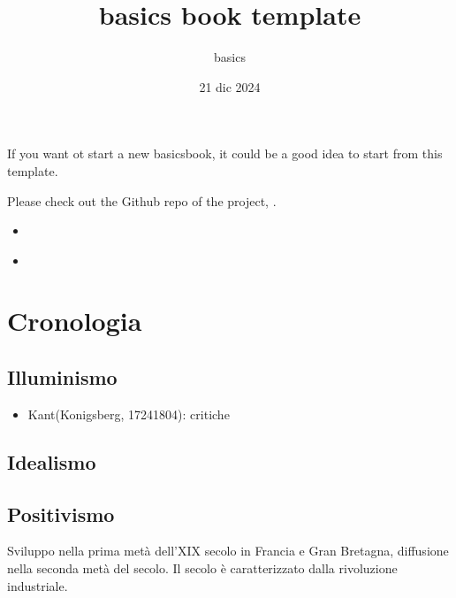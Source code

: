 \documentclass[letterpaper,10pt,italian]{jupyterBook}
\title{basics book template}
\date{21 dic 2024}
\author{basics}
\begin{document}
\pagestyle{empty}
\sphinxmaketitle
\pagestyle{plain}
\sphinxtableofcontents
\pagestyle{normal}
\label{\detokenize{intro::doc}}


\sphinxAtStartPar
If you want ot start a new basics\sphinxhyphen{}book, it could be a good idea to start from this template.

\sphinxAtStartPar
Please check out the Github repo of the project, .
\begin{itemize}
\item {} 
\sphinxAtStartPar
{\hyperref[\detokenize{ch/history::doc}]{}}

\item {} 
\sphinxAtStartPar
{\hyperref[\detokenize{ch/topics::doc}]{}}

\end{itemize}

\sphinxstepscope


\chapter{Cronologia}
\label{\detokenize{ch/history:cronologia}}\label{\detokenize{ch/history:philosophy-chronology}}\label{\detokenize{ch/history::doc}}

\section{Illuminismo}
\label{\detokenize{ch/history:illuminismo}}\label{\detokenize{ch/history:pc-illuminism}}
\sphinxAtStartPar
{}
\begin{itemize}
\item {} 
\sphinxAtStartPar
Kant(Konigsberg, 1724\sphinxhyphen{}1804): critiche

\end{itemize}


\section{Idealismo}
\label{\detokenize{ch/history:pc-idealism}}\label{\detokenize{ch/history:idealismo}}

\section{Positivismo}
\label{\detokenize{ch/history:positivismo}}\label{\detokenize{ch/history:pc-positivism}}
\sphinxAtStartPar
{} Sviluppo nella prima metà dell’XIX secolo in Francia e Gran Bretagna, diffusione nella seconda metà del secolo. Il secolo è caratterizzato dalla rivoluzione industriale.
\end{document}
